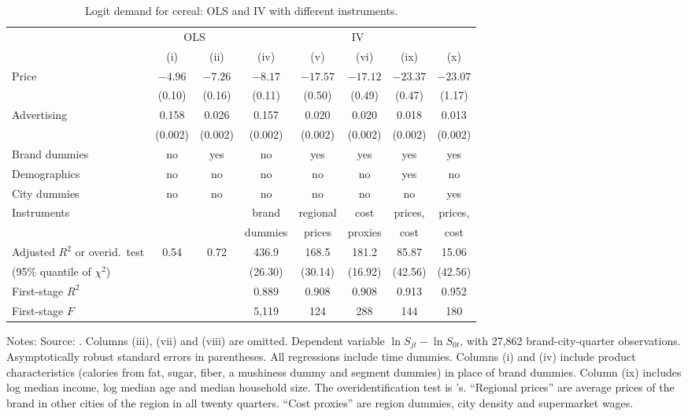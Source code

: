 \begin{table}[htbp]
\centering
\caption{Logit demand for cereal: OLS and IV with different instruments.}
\label{tab:07-nevo-logit}
\footnotesize
\setlength{\tabcolsep}{4pt}
\begin{tabular}{lccccccc}
\toprule
 & \multicolumn{2}{c}{OLS} & \multicolumn{5}{c}{IV} \\
\cmidrule(lr){2-3}\cmidrule(lr){4-8}
 & (i) & (ii) & (iv) & (v) & (vi) & (ix) & (x) \\
\midrule
Price & $-4.96$ & $-7.26$ & $-8.17$ & $-17.57$ & $-17.12$ & $-23.37$ & $-23.07$ \\
 & (0.10) & (0.16) & (0.11) & (0.50) & (0.49) & (0.47) & (1.17) \\
Advertising & 0.158 & 0.026 & 0.157 & 0.020 & 0.020 & 0.018 & 0.013 \\
 & (0.002) & (0.002) & (0.002) & (0.002) & (0.002) & (0.002) & (0.002) \\
Brand dummies & no & yes & no & yes & yes & yes & yes \\
Demographics & no & no & no & no & no & yes & no \\
City dummies & no & no & no & no & no & no & yes \\
Instruments & & & brand & regional & cost & prices, & prices, \\
 & & & dummies & prices & proxies & cost & cost \\
\midrule
Adjusted $R^2$ or overid.\ test & 0.54 & 0.72 & 436.9 & 168.5 & 181.2 & 85.87 & 15.06 \\
\quad (95\% quantile of $\chi^2$) & & & (26.30) & (30.14) & (16.92) & (42.56) & (42.56) \\
First-stage $R^2$ & & & 0.889 & 0.908 & 0.908 & 0.913 & 0.952 \\
First-stage $F$ & & & 5,119 & 124 & 288 & 144 & 180 \\
\bottomrule
\end{tabular}
\par\smallskip
\parbox{\linewidth}{\footnotesize Notes: Source: \citet[Table~V, p.~324]{Nevo2001}. Columns (iii), (vii) and (viii) are
omitted. Dependent variable $\ln S_{jt} - \ln S_{0t}$, with 27,862 brand-city-quarter observations. Asymptotically
robust standard errors in parentheses. All regressions include time dummies. Columns (i) and (iv) include product
characteristics (calories from fat, sugar, fiber, a mushiness dummy and segment dummies) in place of brand dummies.
Column (ix) includes log median income, log median age and median household size. The overidentification test is
\citet{Hausman1983}'s. ``Regional prices'' are average prices of the brand in other cities of the region in all twenty
quarters. ``Cost proxies'' are region dummies, city density and supermarket wages.}
\end{table}


